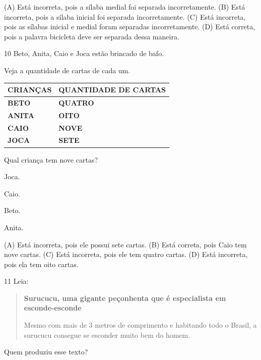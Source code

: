 (A) Está incorreta, pois a sílaba medial foi separada incorretamente.
(B) Está incorreta, pois a sílaba inicial foi separada incorretamente.
(C) Está incorreta, pois as sílabas inicial e medial foram separadas incorretamente.
(D) Está correta, pois a palavra bicicleta deve ser separada dessa maneira.

\num{10} Beto, Anita, Caio e Joca estão brincado de bafo.

Veja a quantidade de cartas de cada um.

\begin{longtable}[]{@{}ll@{}}
\toprule
\textbf{CRIANÇAS} & \textbf{QUANTIDADE DE CARTAS}\tabularnewline
\midrule
\endhead
\textbf{BETO} & \textbf{QUATRO}\tabularnewline
\textbf{ANITA} & \textbf{OITO}\tabularnewline
\textbf{CAIO} & \textbf{NOVE}\tabularnewline
\textbf{JOCA} & \textbf{SETE}\tabularnewline
\bottomrule
\end{longtable}

Qual criança tem nove cartas?

\begin{escolha}
\item Joca.

\item Caio.

\item Beto.

\item Anita.
\end{escolha}


(A) Está incorreta, pois ele possui sete cartas.
(B) Está correta, pois Caio tem nove cartas.
(C) Está incorreta, pois ele tem quatro cartas.
(D) Está incorreta, pois ela tem oito cartas.

\num{11} Leia:

\begin{quote}
\textbf{Surucucu, uma gigante peçonhenta que é especialista em esconde-esconde}

Mesmo com mais de 3 metros de comprimento e habitando todo o Brasil, a
surucucu consegue se esconder muito bem do homem.
\end{quote}


Quem produziu esse texto?

